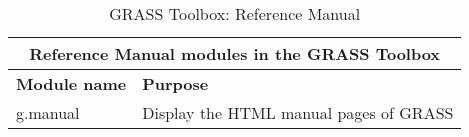 \begin{table}[ht]
\centering
\caption{GRASS Toolbox: Reference Manual}\medskip
 \begin{tabular}{|p{4cm}|p{12cm}|}
  \hline \multicolumn{2}{|c|}{\textbf{Reference Manual modules in the GRASS
  Toolbox}} \\
  \hline \textbf{Module name} & \textbf{Purpose} \\
  \hline g.manual & Display the HTML manual pages of GRASS \\
\hline
\end{tabular}
\end{table}




